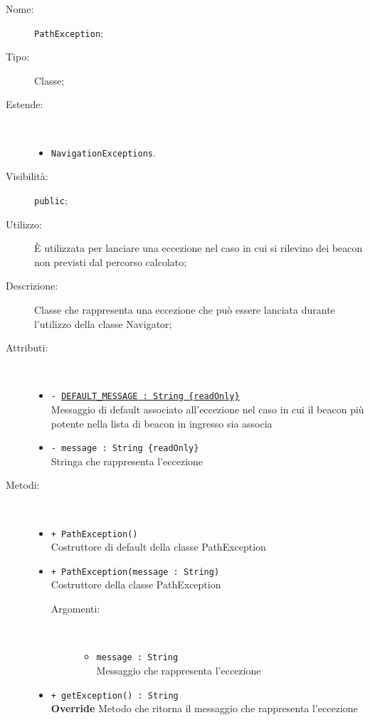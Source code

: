 \documentclass[../DefinizioneDiProdotto.tex]{subfiles}
\begin{document}
\begin{description}
	\item[Nome:] \texttt{PathException};
	\item[Tipo:] Classe;
	\item[Estende:] \
	\begin{itemize}
		\item \texttt{NavigationExceptions}.
	\end{itemize}
	\item[Visibilità:] \texttt{public};
	\item[Utilizzo:] È utilizzata per lanciare una eccezione nel caso in cui si rilevino dei beacon non previsti dal percorso calcolato;
	\item[Descrizione:] Classe che rappresenta una eccezione che può essere lanciata durante l'utilizzo della classe Navigator;
	\item[Attributi:] \
	\begin{itemize}
		\item \texttt{- \underline{DEFAULT\_MESSAGE : String \{readOnly\}}}\\
		Messaggio di default associato all'eccezione nel caso in cui il beacon più potente nella lista di beacon in ingresso sia associa
		
		\item \texttt{- message : String \{readOnly\}}\\
		Stringa che rappresenta l'eccezione
		
	\end{itemize}
	\item[Metodi:] \
	\begin{itemize}
		\item \texttt{+ PathException()}\\
		Costruttore di default della classe PathException
		\item \texttt{+ PathException(message : String)}\\
		Costruttore della classe PathException
		\begin{description}
			\item[Argomenti:] \
			\begin{itemize}
				\item \texttt{message : String}\\
				Messaggio che rappresenta l'eccezione\end{itemize}
		\end{description}
		\item \texttt{+ getException() : String}\\
		\textbf{Override} Metodo che ritorna il messaggio che rappresenta l'eccezione
	\end{itemize}
\end{description}
\end{document}
